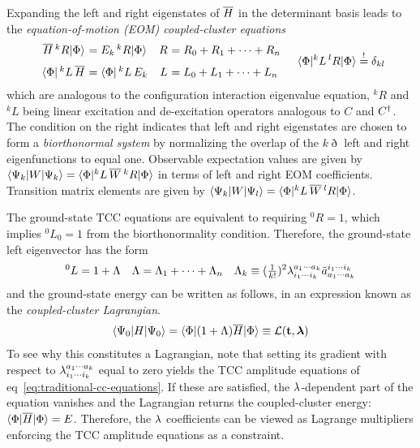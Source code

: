 \documentclass[11pt]{article}
\numberwithin{equation}{section}
\begin{document}
\begin{dfn}
Expanding the left and right eigenstates of $\overline{H}$ in the determinant basis leads to the \textit{equation-of-motion (EOM) coupled-cluster equations}
\begin{align}
\begin{array}{r@{\ }lr@{\ }l}
  \ol{H}
  \,{}^kR
  \kt{\F}
&
=
  E_k
  \,{}^kR
  \kt{\F}
&
  R
&=
  R_0
+
  R_1
+
  \cd
+
  R_n
\\[7pt]
  \br{\F}
  \,{}^kL\,
  \ol{H}
&=
  \br{\F}
  \,{}^kL\,
  E_k
&
  L
&=
  L_0
+
  L_1
+
  \cd
+
  L_n
\end{array}
&&
  \ip{\F|
    {}^kL\,
    {}^lR
  |\F}
\overset{!}{=}
  \d_{kl}
\end{align}
which are analogous to the configuration interaction eigenvalue equation, ${}^kR$ and ${}^kL$ being linear excitation and de-excitation operators analogous to $C$ and $C^\dagger$.
The condition on the right indicates that left and right eigenstates are chosen to form a \textit{biorthonormal system} by normalizing the overlap of the $k\eth$ left and right eigenfunctions to equal one.
Observable expectation values are given by
$
  \langle\Psi _k|W|\Psi _k\rangle
=
  \langle\Phi |{}^kL\,\overline{W}\,{}^kR|\Phi \rangle
$
in terms of left and right EOM coefficients.
Transition matrix elements are given by
$
  \langle\Psi _k|W|\Psi _l\rangle
=
  \langle\Phi |{}^kL\,\overline{W}\,{}^lR|\Phi \rangle
$.
\end{dfn}

\begin{dfn}
The ground-state TCC equations are equivalent to requiring ${}^0R=1$, which implies ${}^0L_0=1$ from the biorthonormality condition.
Therefore, the ground-state left eigenvector has the form
\begin{align}
\label{eq:cc-ground-state-wave-operators}
  {}^0L
=
  1
+
  \Lambda 
&&
  \Lambda 
=
  \Lambda _1
+
  \cdots
+
  \Lambda _n
&&
  \Lambda _k
\equiv
  (\tfrac{1}{k!})^2
  \lambda _{i_1\cdots i_k}^{a_1\cdots a_k}
  \tilde{a}^{i_1\cdots i_k}_{a_1\cdots a_k}
\end{align}
and the ground-state energy can be written as follows, in an expression known as the \textit{coupled-cluster Lagrangian}.
\begin{align}
  \ip{\Y_0|H|\Y_0}
=
  \ip{\F|
    (
      1
    +
      \La
    )
    \ol{H}
  |\F}
\equiv
  \mc{L}(\bo{t},\bm{\la})
\end{align}
To see why this constitutes a Lagrangian, note that setting its gradient with respect to $\lambda _{i_1\cdots i_k}^{a_1\cdots a_k}$ equal to zero yields the TCC amplitude equations of eq~\ref{eq:traditional-cc-equations}.
If these are satisfied, the $\lambda $-dependent part of the equation vanishes and the Lagrangian returns the coupled-cluster energy:
$
  \langle\Phi |\overline{H}|\Phi \rangle
=
  E
$.
Therefore, the $\lambda $ coefficients can be viewed as Lagrange multipliers enforcing the TCC amplitude equations as a constraint.
\end{dfn}
\end{document}
